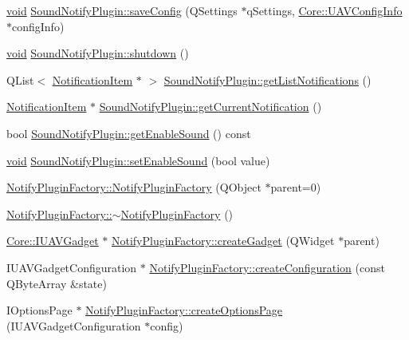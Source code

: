 \begin{DoxyCompactItemize}
\item 
\hyperlink{group___u_a_v_objects_plugin_ga444cf2ff3f0ecbe028adce838d373f5c}{void} \hyperlink{group___notify_plugin_ga591d270cfaee4d5107899bf24ac83289}{\-Sound\-Notify\-Plugin\-::save\-Config} (\-Q\-Settings $\ast$q\-Settings, \hyperlink{class_core_1_1_u_a_v_config_info}{\-Core\-::\-U\-A\-V\-Config\-Info} $\ast$config\-Info)
\item 
\hyperlink{group___u_a_v_objects_plugin_ga444cf2ff3f0ecbe028adce838d373f5c}{void} \hyperlink{group___notify_plugin_ga2f91d9771233415fa6d23a8087331df9}{\-Sound\-Notify\-Plugin\-::shutdown} ()
\item 
\-Q\-List$<$ \hyperlink{class_notification_item}{\-Notification\-Item} $\ast$ $>$ \hyperlink{group___notify_plugin_ga949c06b617fbadfd2c844d9f29351085}{\-Sound\-Notify\-Plugin\-::get\-List\-Notifications} ()
\item 
\hyperlink{class_notification_item}{\-Notification\-Item} $\ast$ \hyperlink{group___notify_plugin_ga286a323009d17d90a51abfbc288bdc68}{\-Sound\-Notify\-Plugin\-::get\-Current\-Notification} ()
\item 
bool \hyperlink{group___notify_plugin_ga25e91be7ff9c99dcb12a2e0931cec530}{\-Sound\-Notify\-Plugin\-::get\-Enable\-Sound} () const 
\item 
\hyperlink{group___u_a_v_objects_plugin_ga444cf2ff3f0ecbe028adce838d373f5c}{void} \hyperlink{group___notify_plugin_ga25cf9833d9cea621e4168a81ee0e9d05}{\-Sound\-Notify\-Plugin\-::set\-Enable\-Sound} (bool value)
\item 
\hyperlink{group___notify_plugin_ga3c91b1f9c5a354b8d5886dd3cff94126}{\-Notify\-Plugin\-Factory\-::\-Notify\-Plugin\-Factory} (\-Q\-Object $\ast$parent=0)
\item 
\hyperlink{group___notify_plugin_ga312b0e9ce81892b5388bb21c4f4c426a}{\-Notify\-Plugin\-Factory\-::$\sim$\-Notify\-Plugin\-Factory} ()
\item 
\hyperlink{class_core_1_1_i_u_a_v_gadget}{\-Core\-::\-I\-U\-A\-V\-Gadget} $\ast$ \hyperlink{group___notify_plugin_gaf83c2c3d9f1f2adfa2629f31821c012e}{\-Notify\-Plugin\-Factory\-::create\-Gadget} (\-Q\-Widget $\ast$parent)
\item 
\-I\-U\-A\-V\-Gadget\-Configuration $\ast$ \hyperlink{group___notify_plugin_gade4f4f78125740032a0bd6d3e920d131}{\-Notify\-Plugin\-Factory\-::create\-Configuration} (const \-Q\-Byte\-Array \&state)
\item 
\-I\-Options\-Page $\ast$ \hyperlink{group___notify_plugin_ga04b86d8ce232e043459331bd3ab5d05d}{\-Notify\-Plugin\-Factory\-::create\-Options\-Page} (\-I\-U\-A\-V\-Gadget\-Configuration $\ast$config)

\end{DoxyCompactItemize}
